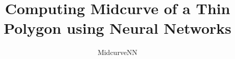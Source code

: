 \documentclass[xcolor=dvipsnames,compress,t,pdf,9pt]{beamer}
\title{Computing Midcurve of a Thin Polygon using Neural Networks}
\subtitle[]{MidcurveNN}
\begin{document}
	\begin{frame}
	\titlepage
	\end{frame}
	
	

	
\end{document}
